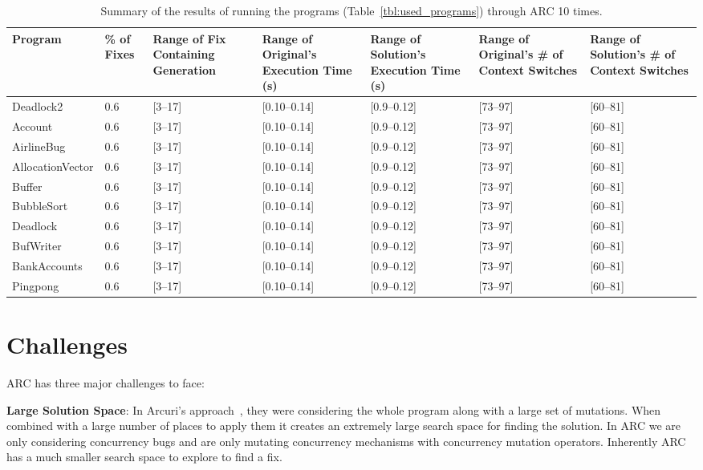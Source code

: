 \documentclass[10pt, conference, compsocconf]{IEEEtran}
\begin{document}
\begin{table}[!t]
\begin{center}
\begin{tabular}{|p{2cm}|p{0.6cm}|p{1.75cm}|p{2cm}|p{2cm}|p{2cm}|p{2cm}|}
\hline
\textbf{Program} &
\textbf{\% of Fixes} &
\textbf{Range of Fix Containing Generation} &
\textbf{Range of Original's Execution Time (s)} &
\textbf{Range of Solution's Execution Time (s)} &
\textbf{Range of Original's \# of Context Switches} &
\textbf{Range of Solution's \# of Context Switches}
\\\hline
Deadlock2 & 0.6 & [3--17] & [0.10--0.14] & [0.9--0.12] & [73--97] & [60--81]
\\\hline
Account & 0.6 & [3--17] & [0.10--0.14] & [0.9--0.12] & [73--97] & [60--81]
\\\hline
AirlineBug & 0.6 & [3--17] & [0.10--0.14] & [0.9--0.12] & [73--97] & [60--81]
\\\hline
AllocationVector & 0.6 & [3--17] & [0.10--0.14] & [0.9--0.12] & [73--97] & [60--81]
\\\hline
Buffer & 0.6 & [3--17] & [0.10--0.14] & [0.9--0.12] & [73--97] & [60--81]
\\\hline
BubbleSort & 0.6 & [3--17] & [0.10--0.14] & [0.9--0.12] & [73--97] & [60--81]
\\\hline
Deadlock & 0.6 & [3--17] & [0.10--0.14] & [0.9--0.12] & [73--97] & [60--81]
\\\hline
BufWriter & 0.6 & [3--17] & [0.10--0.14] & [0.9--0.12] & [73--97] & [60--81]
\\\hline
BankAccounts & 0.6 & [3--17] & [0.10--0.14] & [0.9--0.12] & [73--97] & [60--81]
\\\hline
Pingpong & 0.6 & [3--17] & [0.10--0.14] & [0.9--0.12] & [73--97] & [60--81]
\\\hline
\end{tabular}
\caption{Summary of the results of running the programs (Table~\ref{tbl:used_programs}) through ARC 10 times.}
\label{tbl:summary_results}
\end{center}
\end{table}


\section{Challenges}
\label{sec:challenges}

ARC has three major challenges to face:

\textbf{Large Solution Space}: In Arcuri's approach~\cite{AY08}, they were
considering the whole program along with a large set of mutations. When combined with a large number of places to apply them it creates an extremely large search space for finding the solution. In ARC we are only considering concurrency bugs and are only mutating concurrency mechanisms with concurrency mutation operators. Inherently ARC has a much smaller search space to explore to find a fix. 
\end{document}
